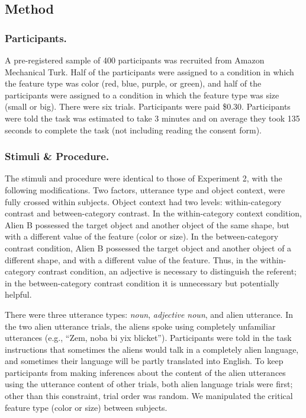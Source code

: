 \documentclass[
  english,
  man,floatsintext]{apa6}
\begin{document}
\hypertarget{method-2}{%
\subsection{Method}\label{method-2}}

\hypertarget{participants.-2}{%
\subsubsection{Participants.}\label{participants.-2}}

A pre-registered sample of 400 participants was recruited from Amazon Mechanical Turk. Half of the participants were assigned to a condition in which the feature type was color (red, blue, purple, or green), and half of the participants were assigned to a condition in which the feature type was size (small or big). There were six trials. Participants were paid \$0.30. Participants were told the task was estimated to take 3 minutes and on average they took 135 seconds to complete the task (not including reading the consent form).

\hypertarget{stimuli-procedure.-1}{%
\subsubsection{Stimuli \& Procedure.}\label{stimuli-procedure.-1}}

The stimuli and procedure were identical to those of Experiment 2, with the following modifications. Two factors, utterance type and object context, were fully crossed within subjects. Object context had two levels: within-category contrast and between-category contrast. In the within-category context condition, Alien B possessed the target object and another object of the same shape, but with a different value of the feature (color or size). In the between-category contrast condition, Alien B possessed the target object and another object of a different shape, and with a different value of the feature. Thus, in the within-category contrast condition, an adjective is necessary to distinguish the referent; in the between-category contrast condition it is unnecessary but potentially helpful.

There were three utterance types: \emph{noun}, \emph{adjective noun}, and alien utterance. In the two alien utterance trials, the aliens spoke using completely unfamiliar utterances (e.g., ``Zem, noba bi yix blicket''). Participants were told in the task instructions that sometimes the aliens would talk in a completely alien language, and sometimes their language will be partly translated into English. To keep participants from making inferences about the content of the alien utterances using the utterance content of other trials, both alien language trials were first; other than this constraint, trial order was random. We manipulated the critical feature type (color or size) between subjects.
\end{document}
